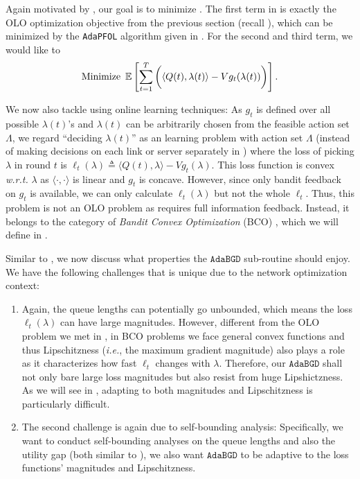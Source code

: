 \documentclass[11pt,fullpage,letterpaper]{article} %
\renewcommand{\bm}[1]{#1}%
\newcommand{\E}{\operatornamewithlimits{\mathbb{E}}}
\newcommand{\OLOAlg}{\texttt{AdaPFOL}\xspace}
\newcommand{\BCOAlg}{\texttt{AdaBGD}\xspace}
\newcommand{\BCO}{\BCOAlg}
\begin{document}
Again motivated by \citet{huang2023queue}, our goal is to minimize .
The first term in  is exactly the OLO optimization objective from the previous section (recall ), which can be minimized by the \OLOAlg algorithm given in .
For the second and third term, we would like to
\begin{equation}
\text{Minimize }\E\left [\sum_{t=1}^T \bigg (\langle \bm Q(t),\bm \lambda(t)\rangle-Vg_t(\bm \lambda(t))\bigg )\right ].\label{eq:multi-hop utility BCO objective informal}
\end{equation}

We now also tackle  using online learning techniques:
As $g_t$ is defined over all possible $\bm \lambda(t)$'s and $\bm \lambda(t)$ can be arbitrarily chosen from the feasible action set $\Lambda$, we regard ``deciding $\bm \lambda(t)$'' as an learning problem with action set $\Lambda$ (instead of making decisions on each link or server separately in ) where the loss of picking $\bm \lambda$ in round $t$ is $
\ell_t(\bm \lambda)\triangleq \langle \bm Q(t),\bm \lambda\rangle - V g_t(\bm \lambda)$.
This loss function is convex \textit{w.r.t.} $\bm \lambda$ as $\langle \cdot,\cdot \rangle$ is linear and $g_t$ is concave.
However, since only bandit feedback on $g_t$ is available, we can only calculate $\ell_t(\bm \lambda)$ but not the whole $\ell_t$. Thus, this problem is not an OLO problem as  requires full information feedback. Instead, it belongs to the category of \textit{Bandit Convex Optimization} (BCO) \citep{flaxman2005online}, which we will define in .

Similar to , we now discuss what properties the $\BCO$ sub-routine should enjoy. We have the following challenges that is unique due to the network optimization context:
\begin{enumerate}
\item[\textit{i)}] Again, the queue lengths can potentially go unbounded, which means the loss $\ell_t(\bm \lambda)$ can have large magnitudes. However, different from the OLO problem we met in , in BCO problems we face general convex functions and thus Lipschitzness (\textit{i.e.}, the maximum gradient magnitude) also plays a role as it characterizes how fast $\ell_t$ changes with $\bm \lambda$. Therefore, our $\BCO$ shall not only bare large loss magnitudes but also resist from huge Lipshictzness. As we will see in , adapting to both magnitudes and Lipschitzness is particularly difficult.
\item[\textit{ii)}] The second challenge is again due to self-bounding analysis: Specifically, we want to conduct self-bounding analyses on the queue lengths and also the utility gap (both similar to ), we also want $\BCO$ to be adaptive to the loss functions' magnitudes and Lipschitzness.
\end{enumerate}
\end{document}
